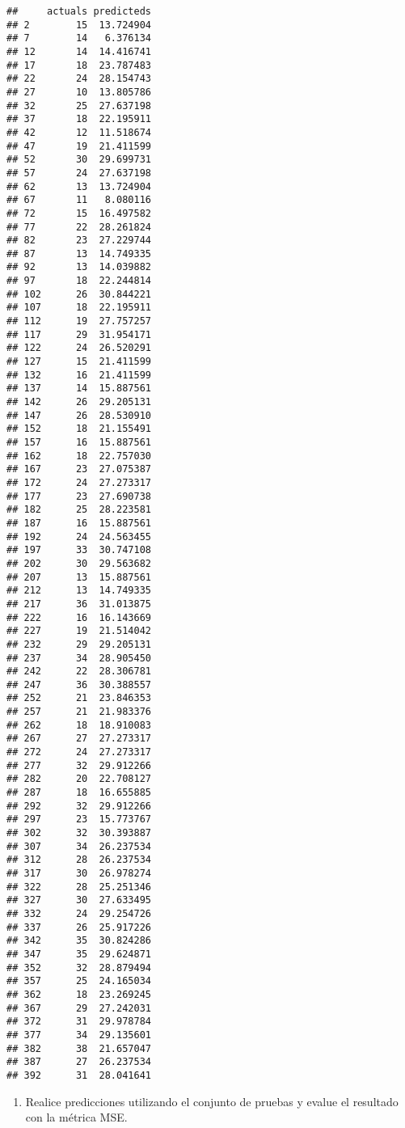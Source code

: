 \documentclass[]{article}
\providecommand{\tightlist}{%
  \setlength{\itemsep}{0pt}\setlength{\parskip}{0pt}}
\begin{document}
\begin{verbatim}
##     actuals predicteds
## 2        15  13.724904
## 7        14   6.376134
## 12       14  14.416741
## 17       18  23.787483
## 22       24  28.154743
## 27       10  13.805786
## 32       25  27.637198
## 37       18  22.195911
## 42       12  11.518674
## 47       19  21.411599
## 52       30  29.699731
## 57       24  27.637198
## 62       13  13.724904
## 67       11   8.080116
## 72       15  16.497582
## 77       22  28.261824
## 82       23  27.229744
## 87       13  14.749335
## 92       13  14.039882
## 97       18  22.244814
## 102      26  30.844221
## 107      18  22.195911
## 112      19  27.757257
## 117      29  31.954171
## 122      24  26.520291
## 127      15  21.411599
## 132      16  21.411599
## 137      14  15.887561
## 142      26  29.205131
## 147      26  28.530910
## 152      18  21.155491
## 157      16  15.887561
## 162      18  22.757030
## 167      23  27.075387
## 172      24  27.273317
## 177      23  27.690738
## 182      25  28.223581
## 187      16  15.887561
## 192      24  24.563455
## 197      33  30.747108
## 202      30  29.563682
## 207      13  15.887561
## 212      13  14.749335
## 217      36  31.013875
## 222      16  16.143669
## 227      19  21.514042
## 232      29  29.205131
## 237      34  28.905450
## 242      22  28.306781
## 247      36  30.388557
## 252      21  23.846353
## 257      21  21.983376
## 262      18  18.910083
## 267      27  27.273317
## 272      24  27.273317
## 277      32  29.912266
## 282      20  22.708127
## 287      18  16.655885
## 292      32  29.912266
## 297      23  15.773767
## 302      32  30.393887
## 307      34  26.237534
## 312      28  26.237534
## 317      30  26.978274
## 322      28  25.251346
## 327      30  27.633495
## 332      24  29.254726
## 337      26  25.917226
## 342      35  30.824286
## 347      35  29.624871
## 352      32  28.879494
## 357      25  24.165034
## 362      18  23.269245
## 367      29  27.242031
## 372      31  29.978784
## 377      34  29.135601
## 382      38  21.657047
## 387      27  26.237534
## 392      31  28.041641
\end{verbatim}

\begin{enumerate}
\def\labelenumi{\arabic{enumi}.}
\setcounter{enumi}{4}
\tightlist
\item
  Realice predicciones utilizando el conjunto de pruebas y evalue el
  resultado con la métrica MSE.
\end{enumerate}
\end{document}
